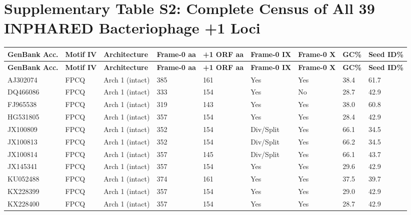 \documentclass[10pt,letterpaper]{article}
\begin{document}
\newpage
\section*{Supplementary Table S2: Complete Census of All 39 INPHARED Bacteriophage +1 Loci}
\vspace{4pt}
{\scriptsize\setlength{\tabcolsep}{4.2pt}\renewcommand{\arraystretch}{1.10}
\begin{longtable}{@{}lllllllll@{}}
\toprule
\textbf{GenBank Acc.} & \textbf{Motif IV} & \textbf{Architecture} & \textbf{Frame-0 aa} & \textbf{+1 ORF aa} & \textbf{Frame-0 IX} & \textbf{Frame-0 X} & \textbf{GC\%} & \textbf{Seed ID\%} \\
\midrule
\endfirsthead
\toprule
\textbf{GenBank Acc.} & \textbf{Motif IV} & \textbf{Architecture} & \textbf{Frame-0 aa} & \textbf{+1 ORF aa} & \textbf{Frame-0 IX} & \textbf{Frame-0 X} & \textbf{GC\%} & \textbf{Seed ID\%} \\
\midrule
\endhead
\bottomrule
\endfoot
AJ302074 & FPCQ & Arch 1 (intact) & 385 & 161 & Yes & Yes & 38.4 & 61.7 \\
DQ466086 & FPCQ & Arch 1 (intact) & 333 & 154 & Yes & No & 28.7 & 42.9 \\
FJ965538 & FPCQ & Arch 1 (intact) & 319 & 143 & Yes & Yes & 38.0 & 60.8 \\
HG531805 & FPCQ & Arch 1 (intact) & 357 & 154 & Yes & Yes & 28.4 & 42.9 \\
JX100809 & FPCQ & Arch 1 (intact) & 352 & 154 & Div/Split & Yes & 66.1 & 34.5 \\
JX100813 & FPCQ & Arch 1 (intact) & 352 & 154 & Div/Split & Yes & 66.2 & 34.5 \\
JX100814 & FPCQ & Arch 1 (intact) & 357 & 145 & Div/Split & Yes & 66.1 & 43.7 \\
JX145341 & FPCQ & Arch 1 (intact) & 357 & 154 & Yes & Yes & 29.6 & 42.9 \\
KU052488 & FPCQ & Arch 1 (intact) & 374 & 161 & Yes & Yes & 37.5 & 39.7 \\
KX228399 & FPCQ & Arch 1 (intact) & 357 & 154 & Yes & Yes & 29.0 & 42.9 \\
KX228400 & FPCQ & Arch 1 (intact) & 357 & 154 & Yes & Yes & 28.7 & 42.9 \\

\end{longtable}}
\end{document}
